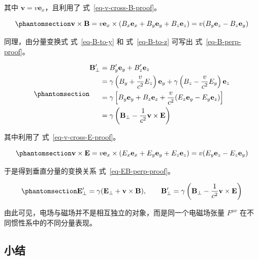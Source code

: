 \documentclass[
  chinese,
  a4paper,
  UTF8,
  12pt,
  oneside,
  openany]{ctexbook}
\theoremstyle{plain}
\theoremstyle{plain}
\theoremstyle{plain}
\theoremstyle{definition}
\theoremstyle{plain}
\theoremstyle{plain}
\theoremstyle{remark}
\begin{document}
其中 \(\mathbf{v} = v\mathbf{e}_x\)，且利用了
式~\ref{eq-v-cross-B-proof}。

\begin{equation}\protect\phantomsection\label{eq-v-cross-B-proof}{
\mathbf{v} \times \mathbf{B}
= v\mathbf{e}_x \times (B_x\mathbf{e}_x + B_y\mathbf{e}_y + B_z\mathbf{e}_z)
= v(B_y\mathbf{e}_z - B_z\mathbf{e}_y)
}\end{equation}

同理，由分量变换式 式~\ref{eq-B-to-y} 和 式~\ref{eq-B-to-z} 可写出
式~\ref{eq-B-perp-proof}。

\begin{equation}\protect\phantomsection\label{eq-B-perp-proof}{
\begin{aligned}
\mathbf{B}'_\perp
&= B'_y \mathbf{e}_y + B'_z \mathbf{e}_z \\
&= \gamma\left(B_y + \frac{v}{c^2}E_z\right)\mathbf{e}_y + \gamma\left(B_z - \frac{v}{c^2}E_y\right)\mathbf{e}_z \\
&= \gamma\left[ B_y \mathbf{e}_y + B_z \mathbf{e}_z + \frac{v}{c^2}(E_z \mathbf{e}_y - E_y \mathbf{e}_z) \right] \\
&= \gamma\left(\mathbf{B}_\perp - \frac{1}{c^2}\mathbf{v} \times \mathbf{E}\right)
\end{aligned}
}\end{equation}

其中利用了 式~\ref{eq-v-cross-E-proof}。

\begin{equation}\protect\phantomsection\label{eq-v-cross-E-proof}{
\mathbf{v} \times \mathbf{E}
= v\mathbf{e}_x \times (E_x\mathbf{e}_x + E_y\mathbf{e}_y + E_z\mathbf{e}_z)
= v(E_y\mathbf{e}_z - E_z\mathbf{e}_y)
}\end{equation}

于是得到垂直分量的变换关系 式~\ref{eq-EB-perp-proof}。

\begin{equation}\protect\phantomsection\label{eq-EB-perp-proof}{
\mathbf{E}'_\perp = \gamma(\mathbf{E}_\perp + \mathbf{v} \times \mathbf{B}), \qquad \mathbf{B}'_\perp = \gamma\left(\mathbf{B}_\perp - \frac{1}{c^2}\mathbf{v} \times \mathbf{E}\right)
}\end{equation}

由此可见，电场与磁场并不是相互独立的对象，而是同一个电磁场张量
\(F^{\mu\nu}\) 在不同惯性系中的不同分量表现。

\subsection{小结}\label{ux5c0fux7ed3}
\end{document}
